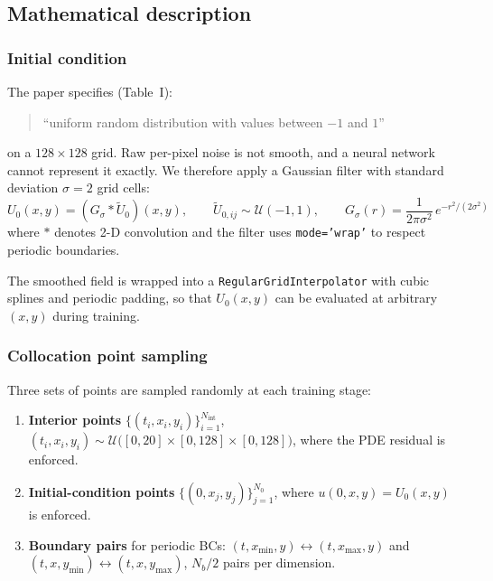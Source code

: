 \documentclass[11pt,a4paper]{article}
\begin{document}
\subsection*{Mathematical description}

\subsubsection*{Initial condition}

The paper specifies (Table~I):
\begin{quote}
  ``uniform random distribution with values between $-1$ and $1$''
\end{quote}
on a $128 \times 128$ grid.  Raw per-pixel noise is not smooth, and a
neural network cannot represent it exactly.  We therefore apply a
Gaussian filter with standard deviation $\sigma = 2$ grid cells:
\begin{equation}
  U_0(x,y) = (G_{\sigma} * \tilde{U}_0)(x,y),
  \qquad
  \tilde{U}_{0,ij} \sim \mathcal{U}(-1, 1),
  \qquad
  G_{\sigma}(r) = \frac{1}{2\pi\sigma^2}\,e^{-r^2/(2\sigma^2)}
\label{eq:ic}
\end{equation}
where $*$ denotes 2-D convolution and the filter uses \texttt{mode='wrap'}
to respect periodic boundaries.

The smoothed field is wrapped into a
\texttt{RegularGridInterpolator} with cubic splines and periodic
padding, so that $U_0(x,y)$ can be evaluated at arbitrary $(x,y)$
during training.

\subsubsection*{Collocation point sampling}

Three sets of points are sampled randomly at each training stage:

\begin{enumerate}[nosep]
  \item \textbf{Interior points}
        $\{(t_i,x_i,y_i)\}_{i=1}^{N_{\mathrm{int}}}$,
        $(t_i,x_i,y_i) \sim \mathcal{U}\bigl([0,20]\times[0,128]\times[0,128]\bigr)$,
        where the PDE residual is enforced.
  \item \textbf{Initial-condition points}
        $\{(0, x_j, y_j)\}_{j=1}^{N_0}$,
        where $u(0,x,y) = U_0(x,y)$ is enforced.
  \item \textbf{Boundary pairs} for periodic BCs:
        $(t,x_{\min},y) \leftrightarrow (t,x_{\max},y)$ and
        $(t,x,y_{\min}) \leftrightarrow (t,x,y_{\max})$, $N_b/2$
        pairs per dimension.
\end{enumerate}
\end{document}
